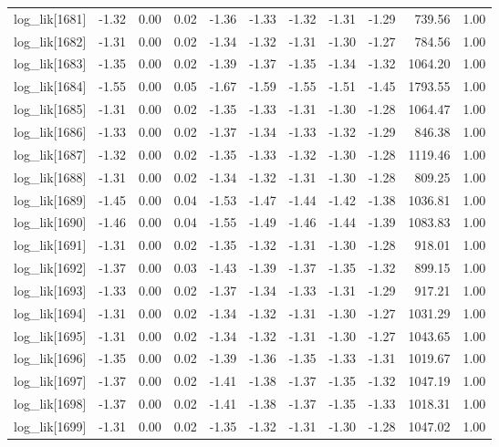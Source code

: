 \begin{table}[ht]
\begin{tabular}{rrrrrrrrrrr}
  log\_lik[1681] & -1.32 & 0.00 & 0.02 & -1.36 & -1.33 & -1.32 & -1.31 & -1.29 & 739.56 & 1.00 \\ 
  log\_lik[1682] & -1.31 & 0.00 & 0.02 & -1.34 & -1.32 & -1.31 & -1.30 & -1.27 & 784.56 & 1.00 \\ 
  log\_lik[1683] & -1.35 & 0.00 & 0.02 & -1.39 & -1.37 & -1.35 & -1.34 & -1.32 & 1064.20 & 1.00 \\ 
  log\_lik[1684] & -1.55 & 0.00 & 0.05 & -1.67 & -1.59 & -1.55 & -1.51 & -1.45 & 1793.55 & 1.00 \\ 
  log\_lik[1685] & -1.31 & 0.00 & 0.02 & -1.35 & -1.33 & -1.31 & -1.30 & -1.28 & 1064.47 & 1.00 \\ 
  log\_lik[1686] & -1.33 & 0.00 & 0.02 & -1.37 & -1.34 & -1.33 & -1.32 & -1.29 & 846.38 & 1.00 \\ 
  log\_lik[1687] & -1.32 & 0.00 & 0.02 & -1.35 & -1.33 & -1.32 & -1.30 & -1.28 & 1119.46 & 1.00 \\ 
  log\_lik[1688] & -1.31 & 0.00 & 0.02 & -1.34 & -1.32 & -1.31 & -1.30 & -1.28 & 809.25 & 1.00 \\ 
  log\_lik[1689] & -1.45 & 0.00 & 0.04 & -1.53 & -1.47 & -1.44 & -1.42 & -1.38 & 1036.81 & 1.00 \\ 
  log\_lik[1690] & -1.46 & 0.00 & 0.04 & -1.55 & -1.49 & -1.46 & -1.44 & -1.39 & 1083.83 & 1.00 \\ 
  log\_lik[1691] & -1.31 & 0.00 & 0.02 & -1.35 & -1.32 & -1.31 & -1.30 & -1.28 & 918.01 & 1.00 \\ 
  log\_lik[1692] & -1.37 & 0.00 & 0.03 & -1.43 & -1.39 & -1.37 & -1.35 & -1.32 & 899.15 & 1.00 \\ 
  log\_lik[1693] & -1.33 & 0.00 & 0.02 & -1.37 & -1.34 & -1.33 & -1.31 & -1.29 & 917.21 & 1.00 \\ 
  log\_lik[1694] & -1.31 & 0.00 & 0.02 & -1.34 & -1.32 & -1.31 & -1.30 & -1.27 & 1031.29 & 1.00 \\ 
  log\_lik[1695] & -1.31 & 0.00 & 0.02 & -1.34 & -1.32 & -1.31 & -1.30 & -1.27 & 1043.65 & 1.00 \\ 
  log\_lik[1696] & -1.35 & 0.00 & 0.02 & -1.39 & -1.36 & -1.35 & -1.33 & -1.31 & 1019.67 & 1.00 \\ 
  log\_lik[1697] & -1.37 & 0.00 & 0.02 & -1.41 & -1.38 & -1.37 & -1.35 & -1.32 & 1047.19 & 1.00 \\ 
  log\_lik[1698] & -1.37 & 0.00 & 0.02 & -1.41 & -1.38 & -1.37 & -1.35 & -1.33 & 1018.31 & 1.00 \\ 
  log\_lik[1699] & -1.31 & 0.00 & 0.02 & -1.35 & -1.32 & -1.31 & -1.30 & -1.28 & 1047.02 & 1.00 \\ 

\end{tabular}
\end{table}
